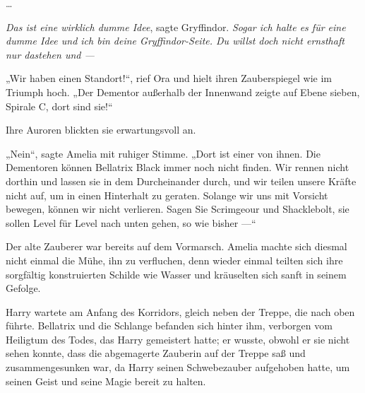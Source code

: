 …

\emph{Das ist eine wirklich dumme Idee}, sagte Gryffindor. \emph{Sogar ich halte es für eine dumme Idee und ich bin deine Gryffindor-Seite. Du willst doch nicht ernsthaft nur dastehen und —}

\later

„Wir haben einen Standort!“, rief Ora und hielt ihren Zauberspiegel wie im Triumph hoch.
„Der Dementor außerhalb der Innenwand zeigte auf Ebene sieben, Spirale C, dort sind sie!“

Ihre Auroren blickten sie erwartungsvoll an.

„Nein“, sagte Amelia mit ruhiger Stimme.
„Dort ist einer von ihnen. Die Dementoren können Bellatrix Black immer noch nicht finden. Wir rennen nicht dorthin und lassen sie in dem Durcheinander durch, und wir teilen unsere Kräfte nicht auf, um in einen Hinterhalt zu geraten. Solange wir uns mit Vorsicht bewegen, können wir nicht verlieren. Sagen Sie Scrimgeour und Shacklebolt, sie sollen Level für Level nach unten gehen, so wie bisher —“

Der alte Zauberer war bereits auf dem Vormarsch. Amelia machte sich diesmal nicht einmal die Mühe, ihn zu verfluchen, denn wieder einmal teilten sich ihre sorgfältig konstruierten Schilde wie Wasser und kräuselten sich sanft in seinem Gefolge.

\later

Harry wartete am Anfang des Korridors, gleich neben der Treppe, die nach oben führte. Bellatrix und die Schlange befanden sich hinter ihm, verborgen vom Heiligtum des Todes, das Harry gemeistert hatte; er wusste, obwohl er sie nicht sehen konnte, dass die abgemagerte Zauberin auf der Treppe saß und zusammengesunken war, da Harry seinen Schwebezauber aufgehoben hatte, um seinen Geist und seine Magie bereit zu halten.

